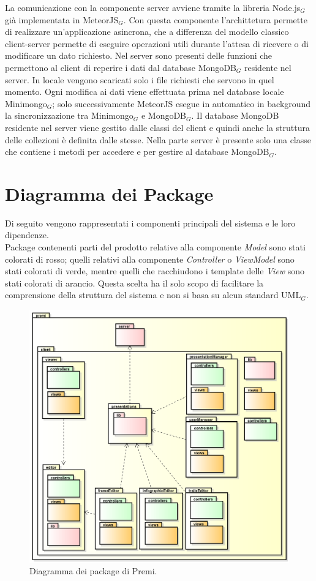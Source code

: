 La comunicazione con la componente server avviene tramite la libreria Node.js$_G$ già implementata in MeteorJS$_G$. Con questa componente l'archittetura permette di realizzare un'applicazione asincrona, che a differenza del modello classico client-server permette di eseguire operazioni utili durante l'attesa di ricevere o di modificare un dato richiesto.
Nel server sono presenti delle funzioni che permettono al client di reperire i dati dal database MongoDB$_G$ residente nel server. In locale vengono scaricati solo i file richiesti che servono in quel momento. Ogni modifica ai dati viene effettuata prima nel database locale Minimongo$_G$; solo successivamente MeteorJS esegue in automatico in background la sincronizzazione tra Minimongo$_G$ e MongoDB$_G$. Il database MongoDB residente nel server viene gestito dalle classi del client e quindi anche la struttura delle collezioni è definita dalle stesse. Nella parte server è presente solo una classe che contiene i metodi per accedere e per gestire al database MongoDB$_G$.
\clearpage
\newpage
\section{Diagramma dei Package}
Di seguito vengono rappresentati i componenti principali del sistema e le loro dipendenze. \\
Package contenenti parti del prodotto relative alla componente \textit{Model} sono stati colorati di rosso; quelli relativi alla componente \textit{Controller} o \textit{ViewModel} sono stati colorati di verde, mentre quelli che racchiudono i template delle \textit{View} sono stati colorati di arancio. Questa scelta ha il solo scopo di facilitare la comprensione della struttura del sistema e non si basa su alcun standard UML$_G$.

\begin{figure}[h]
\begin{center}
\includegraphics[scale=0.40]{img/diapkg/package.png}
\caption{Diagramma dei package di Premi.}
\end{center}
\end{figure}

